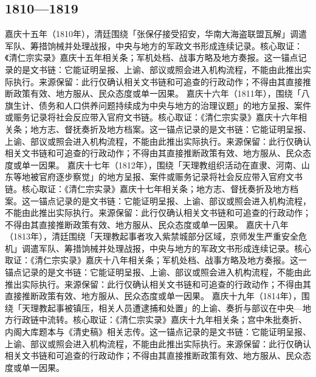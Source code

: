 \subsection{1810—1819}
嘉庆十五年（1810年），清廷围绕「张保仔接受招安，华南大海盗联盟瓦解」调遣军队、筹措饷械并处理战报，中央与地方的军政文书形成连续记录。核心取证：《清仁宗实录》嘉庆十五年相关条；军机处档、战事方略及地方奏报。这一锚点记录的是文书链：它能证明呈报、上谕、部议或照会进入机构流程，不能由此推出实际执行。来源保留：此行仅确认相关文书链和可追查的行政动作；不得由其直接推断政策有效、地方服从、民众态度或单一因果。
嘉庆十六年（1811年），围绕「八旗生计、债务和人口供养问题持续成为中央与地方的治理议题」的地方呈报、案件或赈务记录将社会反应带入官府文书链。核心取证：《清仁宗实录》嘉庆十六年相关条；地方志、督抚奏折及地方档案。这一锚点记录的是文书链：它能证明呈报、上谕、部议或照会进入机构流程，不能由此推出实际执行。来源保留：此行仅确认相关文书链和可追查的行政动作；不得由其直接推断政策有效、地方服从、民众态度或单一因果。
嘉庆十七年（1812年），围绕「天理教组织活动在直隶、河南、山东等地被官府逐步察觉」的地方呈报、案件或赈务记录将社会反应带入官府文书链。核心取证：《清仁宗实录》嘉庆十七年相关条；地方志、督抚奏折及地方档案。这一锚点记录的是文书链：它能证明呈报、上谕、部议或照会进入机构流程，不能由此推出实际执行。来源保留：此行仅确认相关文书链和可追查的行政动作；不得由其直接推断政策有效、地方服从、民众态度或单一因果。
嘉庆十八年（1813年），清廷围绕「天理教起事者攻入紫禁城部分区域，京师发生严重安全危机」调遣军队、筹措饷械并处理战报，中央与地方的军政文书形成连续记录。核心取证：《清仁宗实录》嘉庆十八年相关条；军机处档、战事方略及地方奏报。这一锚点记录的是文书链：它能证明呈报、上谕、部议或照会进入机构流程，不能由此推出实际执行。来源保留：此行仅确认相关文书链和可追查的行政动作；不得由其直接推断政策有效、地方服从、民众态度或单一因果。
嘉庆十九年（1814年），围绕「天理教起事被镇压，相关人员遭逮捕和处置」的上谕、奏折与部议在中央—地方行政链中流转。核心取证：《清仁宗实录》嘉庆十九年相关条；宫中朱批奏折、内阁大库题本与《清史稿》相关志传。这一锚点记录的是文书链：它能证明呈报、上谕、部议或照会进入机构流程，不能由此推出实际执行。来源保留：此行仅确认相关文书链和可追查的行政动作；不得由其直接推断政策有效、地方服从、民众态度或单一因果。
